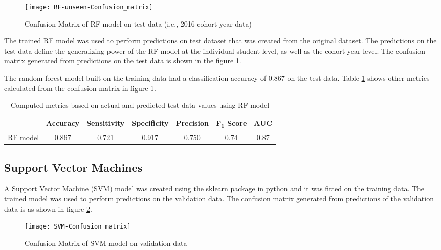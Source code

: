 \documentclass[11pt,openright]{report}
\begin{document}
  \begin{figure}[!htb]
	\centering
	\texttt{[image: RF-unseen-Confusion\_matrix]}
	\caption{Confusion Matrix of RF model on test data (i.e., 2016 cohort year data)}
	\label{fig:RF_unseen_confusion_matrix}
\end{figure} 

The trained RF model was used to perform predictions on test dataset that was created from the original dataset. The predictions on the test data define the generalizing power of the RF model at the individual student level, as well as the cohort year level. The confusion matrix generated from predictions on the test data is shown in the figure \ref{fig:RF_unseen_confusion_matrix}.

The random forest model built on the training data had a classification accuracy of 0.867 on the test data. Table \ref{table:RF-unseen_metrics_db} shows other metrics calculated from the confusion matrix in figure \ref{fig:RF_unseen_confusion_matrix}.

\begin{table}[!htb]
	\renewcommand{\arraystretch}{1.3}
	\caption{Computed metrics based on actual and predicted test data values using RF model}
	\label{table:RF-unseen_metrics_db}
	\centering
	\begin{tabular}{|c|c|c|c|c|c|c|}
    \hline
  	 & \bfseries Accuracy & \bfseries Sensitivity & \bfseries Specificity & \bfseries Precision & \bfseries F\textsubscript{1} Score  & \bfseries AUC\\  
    \hline
	RF model & 0.867 & 0.721 & 0.917 & 0.750 & 0.74 & 0.87 \\ \hline
	\end{tabular} 
\end{table}


\subsection {Support Vector Machines}
A Support Vector Machine (SVM) model was created using the sklearn package in python and it was fitted on the training data. The trained model was used to perform predictions on the validation data. The confusion matrix generated from predictions of the validation data is as shown in figure \ref{fig:SVM_confusion_matrix}.

  \begin{figure}[!htb]
	\centering
	\texttt{[image: SVM-Confusion\_matrix]}
	\caption{Confusion Matrix of SVM model on validation data}
	\label{fig:SVM_confusion_matrix}
\end{figure} 
\end{document}
